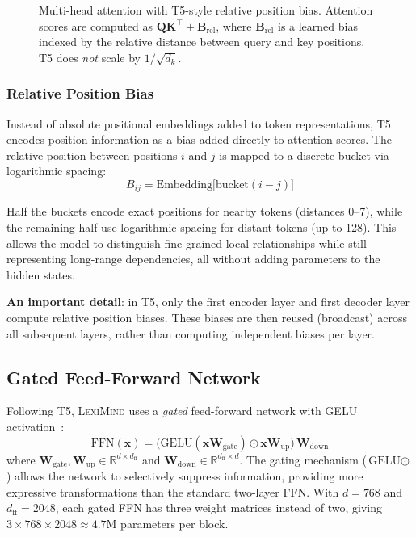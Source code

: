 \documentclass[11pt,a4paper]{article}
\newcommand{\lexiname}{\textsc{LexiMind}}
\renewcommand{\R}{\mathbb{R}}
\newcommand{\gelu}{\text{GELU}}
\begin{document}
\begin{figure}[t]
\caption{Multi-head attention with T5-style relative position bias. Attention scores are computed as $\bm{Q}\bm{K}^\top + \bm{B}_\text{rel}$, where $\bm{B}_\text{rel}$ is a learned bias indexed by the relative distance between query and key positions. T5 does \emph{not} scale by $1/\sqrt{d_k}$.}
\label{fig:attention}
\end{figure}

\subsubsection{Relative Position Bias}

Instead of absolute positional embeddings added to token representations, T5 encodes position information as a bias added directly to attention scores.
The relative position between positions $i$ and $j$ is mapped to a discrete bucket via logarithmic spacing:
\begin{equation}
    B_{ij} = \text{Embedding}\bigl[\text{bucket}(i - j)\bigr]
\end{equation}

Half the buckets encode exact positions for nearby tokens (distances 0--7), while the remaining half use logarithmic spacing for distant tokens (up to 128).
This allows the model to distinguish fine-grained local relationships while still representing long-range dependencies, all without adding parameters to the hidden states.

\textbf{An important detail}: in T5, only the first encoder layer and first decoder layer compute relative position biases.
These biases are then reused (broadcast) across all subsequent layers, rather than computing independent biases per layer.

\subsection{Gated Feed-Forward Network}

Following T5, \lexiname{} uses a \emph{gated} feed-forward network with GELU activation~\citep{hendrycks2016gelu}:
\begin{equation}
\label{eq:gated_ffn}
    \text{FFN}(\bm{x}) = \bigl(\gelu(\bm{x}\bm{W}_\text{gate}) \odot \bm{x}\bm{W}_\text{up}\bigr)\,\bm{W}_\text{down}
\end{equation}
where $\bm{W}_\text{gate}, \bm{W}_\text{up} \in \R^{d \times d_\text{ff}}$ and $\bm{W}_\text{down} \in \R^{d_\text{ff} \times d}$.
The gating mechanism ($\gelu \odot$) allows the network to selectively suppress information, providing more expressive transformations than the standard two-layer FFN.
With $d = 768$ and $d_\text{ff} = 2048$, each gated FFN has three weight matrices instead of two, giving $3 \times 768 \times 2048 \approx 4.7$M parameters per block.
\end{document}
